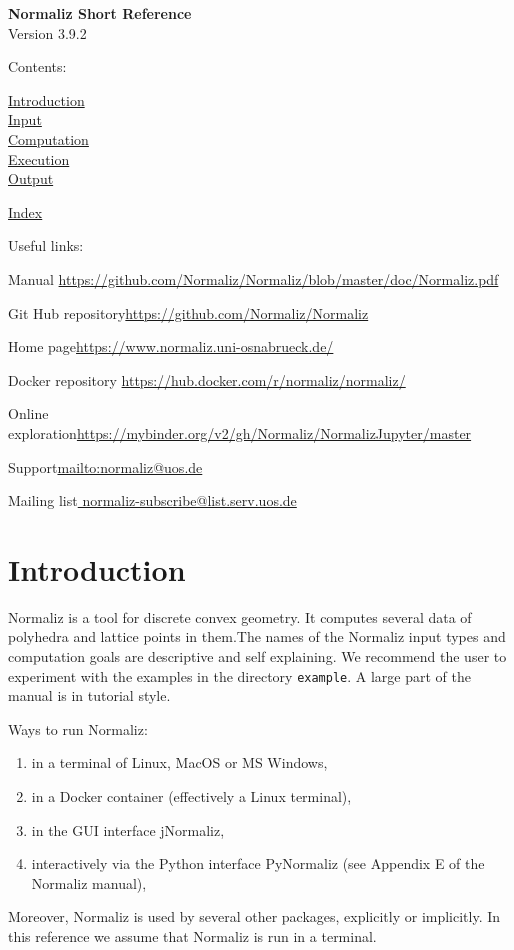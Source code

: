 \documentclass[12pt,a4paper]{scrartcl}
\theoremstyle{definition}
\def\version{3.9.2}
\def\ContLine#1{\hyperref[#1]{\large #1}\\[6pt]}
\def\SectStart#1{\section{#1}\label{#1}\def\SectHead{#1}}
\begin{document}
\vspace*{2cm}


\label{Top}
\begin{center}
\Large\textbf{Normaliz Short Reference}\\[12pt] Version \version
\end{center}

Contents:\bigskip

\ContLine{Introduction}
\ContLine{Input}
\ContLine{Computation}
\ContLine{Execution}
\ContLine{Output}
\medskip

\ContLine{Index}

\bigskip

Useful links:\medskip

Manual \enspace \url{https://github.com/Normaliz/Normaliz/blob/master/doc/Normaliz.pdf}\smallskip

Git Hub repository\enspace \url{https://github.com/Normaliz/Normaliz}\smallskip

Home page\enspace \url{https://www.normaliz.uni-osnabrueck.de/}\smallskip

Docker repository \url{https://hub.docker.com/r/normaliz/normaliz/}\smallskip

Online exploration\enspace	\url{https://mybinder.org/v2/gh/Normaliz/NormalizJupyter/master}\smallskip

Support\enspace 	\url{mailto:normaliz@uos.de} \smallskip

Mailing list\enspace \url{ normaliz-subscribe@list.serv.uos.de}

\newpage

\SectStart{Introduction}

Normaliz is a tool for discrete convex geometry. It computes several data of polyhedra and lattice points in them.The names of the Normaliz input types and computation goals are descriptive and self explaining. We recommend the user to experiment with the examples in  the directory \verb|example|. A large part of the manual is in tutorial style.

Ways to run Normaliz:
\begin{enumerate}
\item in a terminal of Linux, MacOS or MS Windows,
\item in a Docker container (effectively a Linux terminal),
\item in the GUI interface jNormaliz,
\item interactively via the Python interface PyNormaliz (see Appendix E of the Normaliz manual),
\end{enumerate}
Moreover, Normaliz is used by several other packages, explicitly or implicitly. In this reference we assume that Normaliz is run in a terminal.
\end{document}
